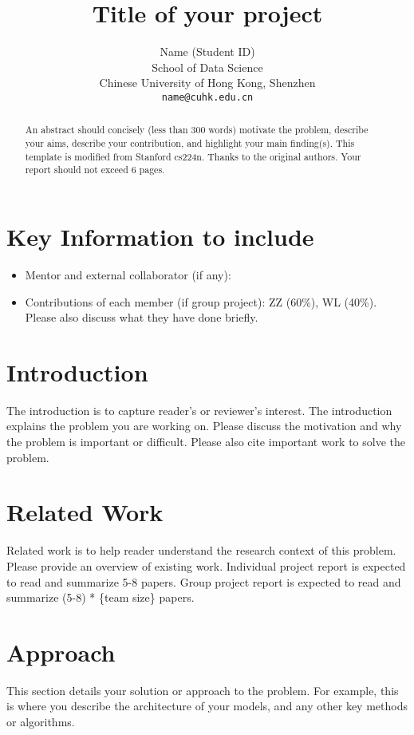 \documentclass{article}
\title{
  Title of your project \\
  \vspace{1em}
}
\author{
  Name (Student ID) \\
  School of Data Science \\
  Chinese University of Hong Kong, Shenzhen \\
  \texttt{name@cuhk.edu.cn} \\
}
\begin{document}
\maketitle

\begin{abstract}
An abstract should concisely (less than 300 words) motivate the problem, describe your aims, describe your contribution, and highlight your main finding(s). This template is modified from Stanford cs224n. Thanks to the original authors. Your report should not exceed 6 pages.
\end{abstract}


\section{Key Information to include}
\begin{itemize}
    \item Mentor and external collaborator (if any):
    \item Contributions of each member (if group project): ZZ (60\%), WL (40\%). Please also discuss what they have done briefly.
\end{itemize}


\section{Introduction}
The introduction is to capture reader's or reviewer's interest. The introduction explains the problem you are working on. Please discuss the motivation and why the problem is important or difficult. Please also cite important work to solve the problem.

\section{Related Work}

Related work is to help reader understand the research context of this problem. Please provide an overview of existing work. Individual project report is expected to read and summarize 5-8 papers. Group project report is expected to read and summarize (5-8) * \{team size\} papers.


\section{Approach}
This section details your solution or approach to the problem. 
For example, this is where you describe the architecture of your models, and any other key methods or algorithms.
\end{document}

